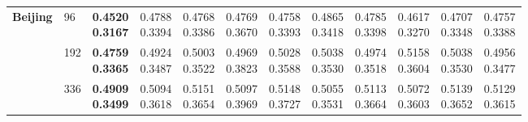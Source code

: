 \begin{longtable}{@{}llcccccccccc@{}}
\textbf{Beijing} & 96 & \shortstack{\colorbox[gray]{0.82}{\textbf{0.4520}}\\\colorbox[gray]{0.82}{\textbf{0.3167}}} & \shortstack{0.4788\\0.3394} & \shortstack{0.4768\\0.3386} & \shortstack{0.4769\\0.3670} & \shortstack{0.4758\\0.3393} & \shortstack{0.4865\\0.3418} & \shortstack{0.4785\\0.3398} & \shortstack{\colorbox[gray]{0.92}{0.4617}\\\colorbox[gray]{0.92}{0.3270}} & \shortstack{0.4707\\0.3348} & \shortstack{0.4757\\0.3388} \\ \cline{2-12}

 & 192 & \shortstack{\colorbox[gray]{0.82}{\textbf{0.4759}}\\\colorbox[gray]{0.82}{\textbf{0.3365}}} & \shortstack{\colorbox[gray]{0.92}{0.4924}\\0.3487} & \shortstack{0.5003\\0.3522} & \shortstack{0.4969\\0.3823} & \shortstack{0.5028\\0.3588} & \shortstack{0.5038\\0.3530} & \shortstack{0.4974\\0.3518} & \shortstack{0.5158\\0.3604} & \shortstack{0.5038\\0.3530} & \shortstack{0.4956\\\colorbox[gray]{0.92}{0.3477}} \\ \cline{2-12}

 & 336 & \shortstack{\colorbox[gray]{0.82}{\textbf{0.4909}}\\\colorbox[gray]{0.82}{\textbf{0.3499}}} & \shortstack{0.5094\\0.3618} & \shortstack{0.5151\\0.3654} & \shortstack{0.5097\\0.3969} & \shortstack{0.5148\\0.3727} & \shortstack{\colorbox[gray]{0.92}{0.5055}\\\colorbox[gray]{0.92}{0.3531}} & \shortstack{0.5113\\0.3664} & \shortstack{0.5072\\0.3603} & \shortstack{0.5139\\0.3652} & \shortstack{0.5129\\0.3615} \\ \cline{2-12}


\end{longtable}

